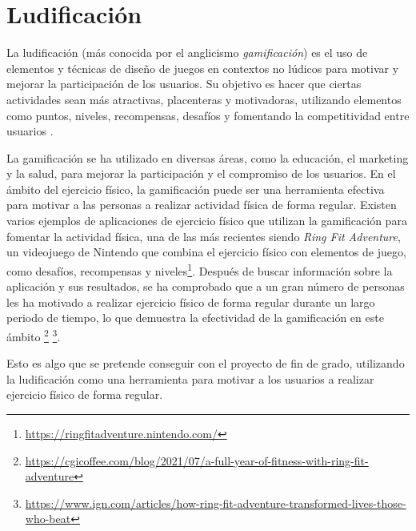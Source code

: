 

\section{Ludificación}
\label{sec:ludificacion}
La ludificación (más conocida por el anglicismo \textit{gamificación}) es el uso
de elementos y técnicas de diseño de juegos en contextos no lúdicos para motivar
y mejorar la participación de los usuarios. Su objetivo es hacer que ciertas
actividades sean más atractivas, placenteras y motivadoras, utilizando elementos
como puntos, niveles, recompensas, desafíos y fomentando la competitividad entre
usuarios \parencite{Deterding_2011}.

La gamificación se ha utilizado en diversas áreas, como la educación, el
marketing y la salud, para mejorar la participación y el compromiso de los
usuarios. En el ámbito del ejercicio físico, la gamificación puede ser una
herramienta efectiva para motivar a las personas a realizar actividad física de
forma regular. Existen varios ejemplos de aplicaciones de ejercicio físico que
utilizan la gamificación para fomentar la actividad física, una de las más
recientes siendo \textit{Ring Fit Adventure}, un videojuego de Nintendo que
combina el ejercicio físico con elementos de juego, como desafíos, recompensas y
niveles\footnote{\url{https://ringfitadventure.nintendo.com/}}. Después de
buscar información sobre la aplicación y sus resultados, se ha comprobado que a
un gran número de personas les ha motivado a realizar ejercicio físico de forma
regular durante un largo periodo de tiempo, lo que demuestra la efectividad de
la gamificación en este ámbito%
\footnote{\url{https://cgicoffee.com/blog/2021/07/a-full-year-of-fitness-with-ring-fit-adventure}}%
\footnote{\url{https://www.ign.com/articles/how-ring-fit-adventure-transformed-lives-those-who-beat}}.

Esto es algo que se pretende conseguir con el proyecto de fin de grado,
utilizando la ludificación como una herramienta para motivar a los usuarios a
realizar ejercicio físico de forma regular.
